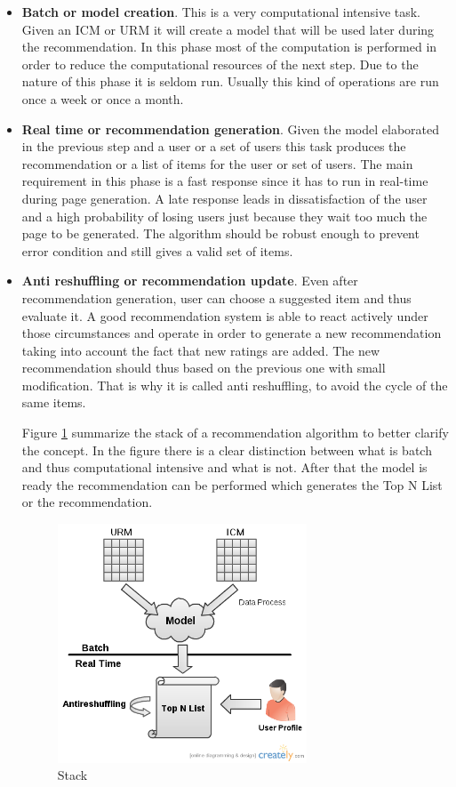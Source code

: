 \begin{itemize}
\item \textbf{Batch or model creation}. This is a very computational intensive task. Given an ICM or URM it will create a model that will be used later during the recommendation. In this phase most of the computation is performed in order to reduce the computational resources of the next step. Due to the nature of this phase it is seldom run. Usually this kind of operations are run once a week or once a month.
\item \textbf{Real time or recommendation generation}. Given the model elaborated in the previous step and a user or a set of users this task produces the recommendation or a list of items for the user or set of users. The main requirement in this phase is a fast response since it has to run in real-time during page generation. A late response leads in dissatisfaction of the user and a high probability of losing users just because they wait too much the page to be generated. The algorithm should be robust enough to prevent error condition and still gives a valid set of items. 
\item \textbf{Anti reshuffling or recommendation update}. Even after recommendation generation, user can choose a suggested item and thus evaluate it. A good recommendation system is able to react actively under those circumstances and operate in order to generate a new recommendation taking into account the fact that new ratings are added. The new recommendation should thus based on the previous one with small modification. That is why it is called anti reshuffling, to avoid the cycle of the same items.

Figure \ref{fig:Stack} summarize the stack of a recommendation algorithm to better clarify the concept. In the figure there is a clear distinction between what is batch and thus computational intensive and what is not. After that the model is ready the recommendation can be performed which generates the Top N List or the recommendation. 
  \begin{figure}
    \centering
    \includegraphics[width=0.7\textwidth]{figures/stack.png}
    \caption{Stack}
    \label{fig:Stack}
  \end{figure}
\end{itemize}


